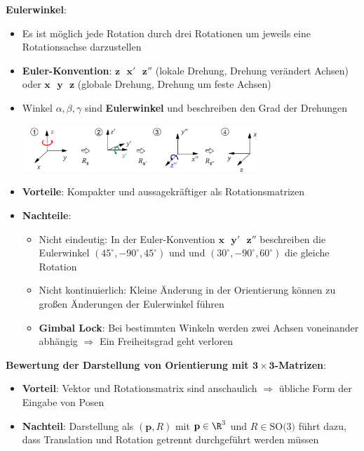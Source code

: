 \textbf{Eulerwinkel}:
\begin{itemize}
	\item Es ist möglich jede Rotation durch drei Rotationen um jeweils eine Rotationsachse darzustellen
	\item \textbf{Euler-Konvention}: $\mathbf{z}\text{ }\mathbf{x'}\text{ }\mathbf{z''}$ (lokale Drehung, Drehung verändert Achsen) oder $\mathbf{x}\text{ }\mathbf{y}\text{ }\mathbf{z}$ (globale Drehung, Drehung um feste Achsen)
	\item Winkel $\alpha,\beta,\gamma$ sind \textbf{Eulerwinkel} und beschreiben den Grad der Drehungen
	\begin{center}
		\includegraphics[width=0.7\textwidth]{images/euler.png}
	\end{center}
	\item \textbf{Vorteile}: Kompakter und aussagekräftiger als Rotationsmatrizen
	\item \textbf{Nachteile}: 
	\begin{itemize}
		\item Nicht eindeutig: In der Euler-Konvention $\mathbf{x}\text{ }\mathbf{y'}\text{ }\mathbf{z''}$ beschreiben die Eulerwinkel $(45^\circ,-90^\circ,45^\circ)$ und 
		und $(30^\circ,-90^\circ,60^\circ)$ die gleiche Rotation
		\item Nicht kontinuierlich: Kleine Änderung in der Orientierung können zu großen Änderungen der Eulerwinkel führen
		\item \textbf{Gimbal Lock}: Bei bestimmten Winkeln werden zwei Achsen voneinander abhängig $\Rightarrow$ Ein Freiheitsgrad geht verloren
	\end{itemize}
\end{itemize}
\bigskip
\textbf{Bewertung der Darstellung von Orientierung mit $\mathbf{3\times3}$-Matrizen}:
\begin{itemize}
	\item \textbf{Vorteil}: Vektor und Rotationsmatrix sind anschaulich $\Rightarrow$ übliche Form der Eingabe von Posen
	\item \textbf{Nachteil}: Darstellung als $(\mathbf{p},R)$ mit $\mathbf{p}\in\R^3$ und $R\in\text{SO(3)}$ führt dazu, dass Translation und Rotation getrennt durchgeführt werden müssen 
\end{itemize}

